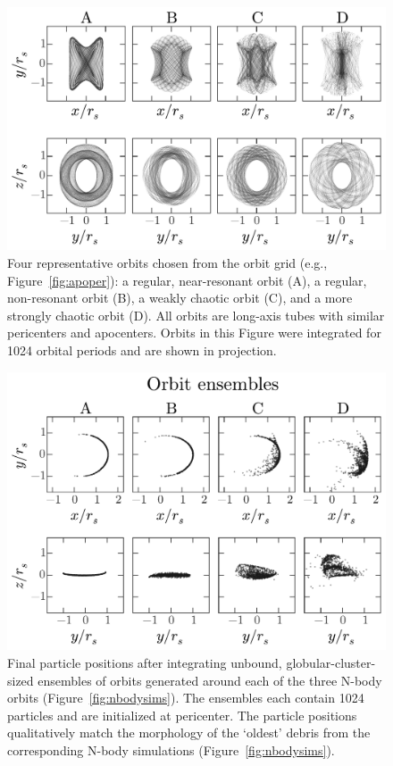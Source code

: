 \documentclass[letterpaper,12pt,preprint]{aastex}
\begin{document}
\begin{figure}[p]
\begin{center}
\includegraphics[width=\textwidth]{figures/four-orbits.pdf}
\caption{Four representative orbits chosen from the orbit grid (e.g., Figure~\ref{fig:apoper}): a regular, near-resonant orbit (A), a regular, non-resonant orbit (B), a weakly chaotic orbit (C), and a more strongly chaotic orbit (D). All orbits are long-axis tubes with similar pericenters and apocenters. Orbits in this Figure were integrated for 1024 orbital periods and are shown in projection.} 
\label{fig:orbits}
\end{center}
\end{figure}

\begin{figure}[p]
\begin{center}
\includegraphics[width=\textwidth]{figures/ensembles.pdf}
\caption{Final particle positions after integrating unbound, globular-cluster-sized ensembles of orbits generated around each of the three N-body orbits (Figure~\ref{fig:nbodysims}). The ensembles each contain 1024 particles and are initialized at pericenter. The particle positions qualitatively match the morphology of the `oldest' debris from the corresponding N-body simulations (Figure~\ref{fig:nbodysims}). } 
\label{fig:ensembles}
\end{center}
\end{figure}
\end{document}
